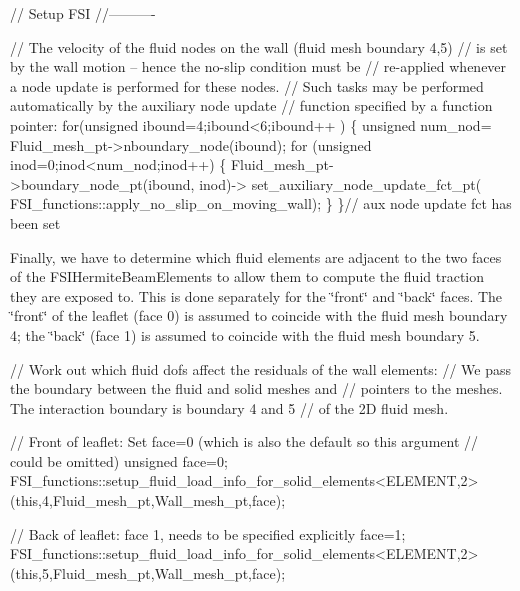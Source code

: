 \begin{DoxyCodeInclude}

 
 \textcolor{comment}{// Setup FSI}
 \textcolor{comment}{//----------}
 
 \textcolor{comment}{// The velocity of the fluid nodes on the wall (fluid mesh boundary 4,5)}
 \textcolor{comment}{// is set by the wall motion -- hence the no-slip condition must be}
 \textcolor{comment}{// re-applied whenever a node update is performed for these nodes. }
 \textcolor{comment}{// Such tasks may be performed automatically by the auxiliary node update }
 \textcolor{comment}{// function specified by a function pointer:}
 \textcolor{keywordflow}{for}(\textcolor{keywordtype}{unsigned} ibound=4;ibound<6;ibound++ )
  \{ 
   \textcolor{keywordtype}{unsigned} num\_nod= Fluid\_mesh\_pt->nboundary\_node(ibound);
   \textcolor{keywordflow}{for} (\textcolor{keywordtype}{unsigned} inod=0;inod<num\_nod;inod++)
    \{   
     Fluid\_mesh\_pt->boundary\_node\_pt(ibound, inod)->
      set\_auxiliary\_node\_update\_fct\_pt(
       FSI\_functions::apply\_no\_slip\_on\_moving\_wall);
    \}
  \}\textcolor{comment}{// aux node update fct has been set}

\end{DoxyCodeInclude}


Finally, we have to determine which fluid elements are adjacent to the two faces of the {\ttfamily F\+S\+I\+Hermite\+Beam\+Elements} to allow them to compute the fluid traction they are exposed to. This is done separately for the \char`\"{}front\char`\"{} and \char`\"{}back\char`\"{} faces. The \char`\"{}front\char`\"{} of the leaflet (face 0) is assumed to coincide with the fluid mesh boundary 4; the \char`\"{}back\char`\"{} (face 1) is assumed to coincide with the fluid mesh boundary 5.


\begin{DoxyCodeInclude}
 
 \textcolor{comment}{// Work out which fluid dofs affect the residuals of the wall elements:}
 \textcolor{comment}{// We pass the boundary between the fluid and solid meshes and }
 \textcolor{comment}{// pointers to the meshes. The interaction boundary is boundary 4 and 5}
 \textcolor{comment}{// of the 2D fluid mesh.}

 \textcolor{comment}{// Front of leaflet: Set face=0 (which is also the default so this argument}
 \textcolor{comment}{// could be omitted)}
 \textcolor{keywordtype}{unsigned} face=0; 
 FSI\_functions::setup\_fluid\_load\_info\_for\_solid\_elements<ELEMENT,2>
  (\textcolor{keyword}{this},4,Fluid\_mesh\_pt,Wall\_mesh\_pt,face); 
 
 \textcolor{comment}{// Back of leaflet: face 1, needs to be specified explicitly}
 face=1; 
 FSI\_functions::setup\_fluid\_load\_info\_for\_solid\_elements<ELEMENT,2>
  (\textcolor{keyword}{this},5,Fluid\_mesh\_pt,Wall\_mesh\_pt,face); 

\end{DoxyCodeInclude}



